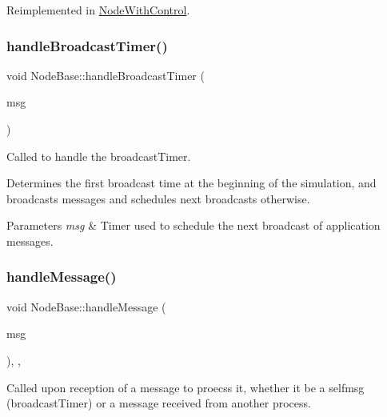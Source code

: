 Reimplemented in \hyperlink{class_node_with_control_aada7451be61be592b27188b6249afef2}{Node\+With\+Control}.

\mbox{\label{class_node_base_a65273f043d18d6f021199fba050700b5}} 
\subsubsection{\texorpdfstring{handle\+Broadcast\+Timer()}{handleBroadcastTimer()}}
{\footnotesize\ttfamily void Node\+Base\+::handle\+Broadcast\+Timer (\begin{DoxyParamCaption}\item[{c\+Message $\ast$}]{msg }\end{DoxyParamCaption})\hspace{0.3cm}{\ttfamily [protected]}}



Called to handle the broadcast\+Timer. 

Determines the first broadcast time at the beginning of the simulation, and broadcasts messages and schedules next broadcasts otherwise. 
\begin{DoxyParams}{Parameters}
{\em msg} & Timer used to schedule the next broadcast of application messages. \\
\hline
\end{DoxyParams}
\mbox{\label{class_node_base_add2450264be5dd616f9f9ac94e83b988}} 
\subsubsection{\texorpdfstring{handle\+Message()}{handleMessage()}}
{\footnotesize\ttfamily void Node\+Base\+::handle\+Message (\begin{DoxyParamCaption}\item[{c\+Message $\ast$}]{msg }\end{DoxyParamCaption})\hspace{0.3cm}{\ttfamily [override]}, {\ttfamily [protected]}, {\ttfamily [virtual]}}



Called upon reception of a message to proecss it, whether it be a selfmsg (broadcast\+Timer) or a message received from another process. 


